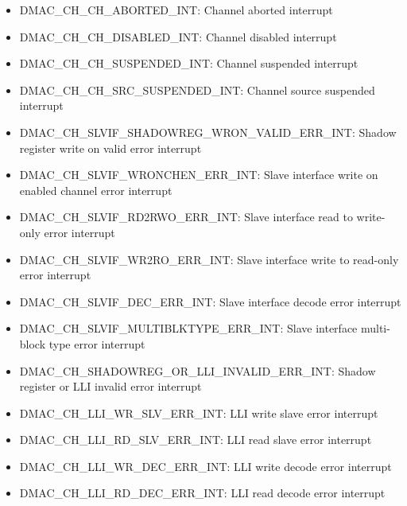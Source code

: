 \documentclass[main\_\_EN.tex]{subfiles}
\begin{document}
\begin{itemize}
    \begin{itemize}
        \item \label{int:DMACCHNCHABORTEDINT}DMAC\_CH\_CH\_ABORTED\_INT: Channel aborted interrupt
        \item \label{int:DMACCHNCHDISABLEDINT}DMAC\_CH\_CH\_DISABLED\_INT: Channel disabled interrupt
        \item \label{int:DMACCHNCHSUSPENDEDINT}DMAC\_CH\_CH\_SUSPENDED\_INT: Channel suspended interrupt
        \item \label{int:DMACCHNCHSRCSUSPENDEDINT}DMAC\_CH\_CH\_SRC\_SUSPENDED\_INT: Channel source suspended interrupt
        \item \label{int:DMACCHNSLVIFSHADOWREGWRONVALIDERRINT}DMAC\_CH\_SLVIF\_SHADOWREG\_WRON\_VALID\_ERR\_INT: Shadow register write on valid error interrupt
        \item \label{int:DMACCHNSLVIFWRONCHENERRINT}DMAC\_CH\_SLVIF\_WRONCHEN\_ERR\_INT: Slave interface write on enabled channel error interrupt
        \item \label{int:DMACCHNSLVIFRD2RWOERRINT}DMAC\_CH\_SLVIF\_RD2RWO\_ERR\_INT: Slave interface read to write-only error interrupt
        \item \label{int:DMACCHNSLVIFWR2ROERRINT}DMAC\_CH\_SLVIF\_WR2RO\_ERR\_INT: Slave interface write to read-only error interrupt
        \item \label{int:DMACCHNSLVIFDECERRINT}DMAC\_CH\_SLVIF\_DEC\_ERR\_INT: Slave interface decode error interrupt
        \item \label{int:DMACCHNSLVIFMULTIBLKTYPEERRINT}DMAC\_CH\_SLVIF\_MULTIBLKTYPE\_ERR\_INT: Slave interface multi-block type error interrupt
        \item \label{int:DMACCHNSHADOWREGORLLIINVALIDERRINT}DMAC\_CH\_SHADOWREG\_OR\_LLI\_INVALID\_ERR\_INT: Shadow register or LLI invalid error interrupt
        \item \label{int:DMACCHNLLIWRSLVERRINT}DMAC\_CH\_LLI\_WR\_SLV\_ERR\_INT: LLI write slave error interrupt
        \item \label{int:DMACCHNLLIRDSLVERRINT}DMAC\_CH\_LLI\_RD\_SLV\_ERR\_INT: LLI read slave error interrupt
        \item \label{int:DMACCHNLLIWRDECERRINT}DMAC\_CH\_LLI\_WR\_DEC\_ERR\_INT: LLI write decode error interrupt
        \item \label{int:DMACCHNLLIRDDECERRINT}DMAC\_CH\_LLI\_RD\_DEC\_ERR\_INT: LLI read decode error interrupt

\end{itemize}
\end{itemize}
\end{document}
